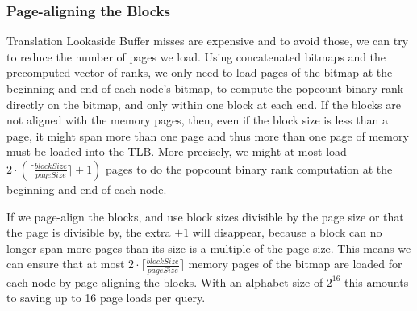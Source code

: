 



\subsubsection{Page-aligning the Blocks}
Translation Lookaside Buffer misses are expensive and to avoid those, we can try to reduce the number of pages we load.
Using concatenated bitmaps and the precomputed vector of ranks, we only need to load pages of the bitmap at the beginning and end of each node's bitmap, to compute the popcount binary rank directly on the bitmap, and only within one block at each end.
If the blocks are not aligned with the memory pages, then, even if the block size is less than a page, it might span more than one page and thus more than one page of memory must be loaded into the TLB.
More precisely, we might at most load $2 \cdot \left( \lceil\frac{blockSize}{pageSize}\rceil +1 \right)$ pages to do the popcount binary rank computation at the beginning and end of each node.

If we page-align the blocks, and use block sizes divisible by the page size or that the page is divisible by, the extra $+1$ will disappear, because a block can no longer span more pages than its size is a multiple of the page size.
This means we can ensure that at most $2 \cdot \lceil\frac{blockSize}{pageSize}\rceil$ memory pages of the bitmap are loaded for each node by page-aligning the blocks.
With an alphabet size of $2^{16}$ this amounts to saving up to 16 page loads per query.

